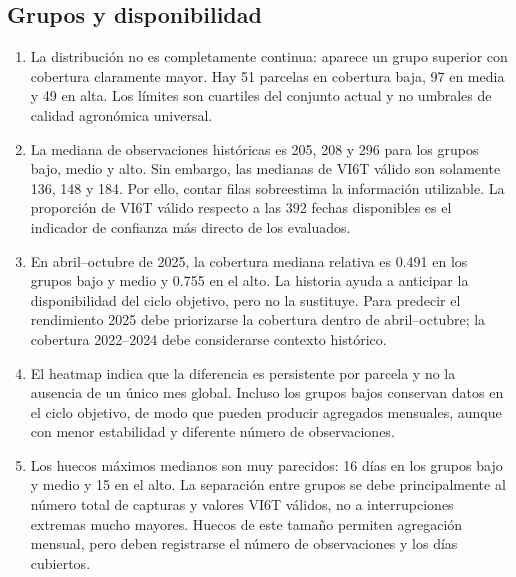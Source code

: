 \documentclass[11pt,a4paper]{article}
\begin{document}
\subsection{Grupos y disponibilidad}
\begin{enumerate}
  \item La distribución no es completamente continua: aparece un grupo superior
  con cobertura claramente mayor. Hay 51 parcelas en cobertura baja, 97 en media
  y 49 en alta. Los límites son cuartiles del conjunto actual y no umbrales de
  calidad agronómica universal.

  \item La mediana de observaciones históricas es 205, 208 y 296 para los grupos
  bajo, medio y alto. Sin embargo, las medianas de VI6T válido son solamente 136,
  148 y 184. Por ello, contar filas sobreestima la información utilizable. La
  proporción de VI6T válido respecto a las 392 fechas disponibles es el indicador
  de confianza más directo de los evaluados.

  \item En abril--octubre de 2025, la cobertura mediana relativa es 0.491 en los
  grupos bajo y medio y 0.755 en el alto. La historia ayuda a anticipar la
  disponibilidad del ciclo objetivo, pero no la sustituye. Para predecir el
  rendimiento 2025 debe priorizarse la cobertura dentro de abril--octubre; la
  cobertura 2022--2024 debe considerarse contexto histórico.

  \item El heatmap indica que la diferencia es persistente por parcela y no la
  ausencia de un único mes global. Incluso los grupos bajos conservan datos en el
  ciclo objetivo, de modo que pueden producir agregados mensuales, aunque con
  menor estabilidad y diferente número de observaciones.

  \item Los huecos máximos medianos son muy parecidos: 16 días en los grupos bajo
  y medio y 15 en el alto. La separación entre grupos se debe principalmente al
  número total de capturas y valores VI6T válidos, no a interrupciones extremas
  mucho mayores. Huecos de este tamaño permiten agregación mensual, pero deben
  registrarse el número de observaciones y los días cubiertos.
\end{enumerate}
\end{document}
